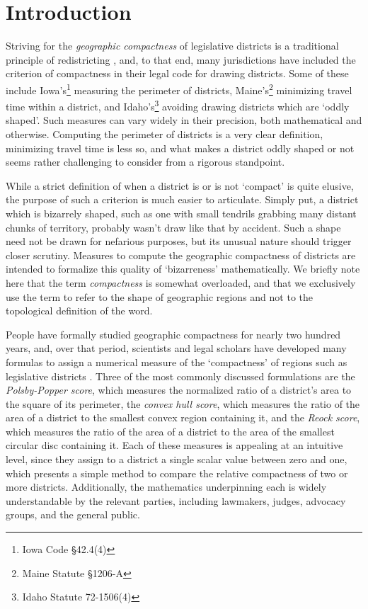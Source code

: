 \section{Introduction}
Striving for the \textit{geographic compactness} of legislative
districts is a traditional principle of redistricting \cite{altman_1998}, and, to that
end, many jurisdictions have included the criterion of compactness in
their legal code for drawing districts.  Some of these include Iowa's\footnote{Iowa Code \S42.4(4)} measuring the perimeter of districts, Maine's\footnote{Maine Statute \S1206-A} minimizing travel time within a district, and Idaho's\footnote{Idaho Statute 72-1506(4)} avoiding 
drawing districts which are \enquote*{oddly shaped}.  Such measures can vary widely in their 
precision, both mathematical and otherwise.  Computing the perimeter of districts is a very clear definition, minimizing travel time is less so, and what makes a district oddly shaped or not seems rather challenging to consider from a rigorous standpoint. 

While a strict definition of when a district is or is not \enquote*{compact} is quite elusive, the purpose of such a criterion is much easier to articulate.  Simply put, a district which is bizarrely shaped, such as one with small tendrils grabbing many distant chunks of territory,
probably wasn't draw like that by accident. Such a shape need not be drawn for nefarious
purposes, but its unusual nature should trigger closer scrutiny.  Measures to compute the
geographic compactness of districts are intended to formalize this quality of \enquote*{bizarreness}
mathematically.  We briefly note here that the term \textit{compactness} is somewhat 
overloaded, and that we exclusively use the term to refer to the shape of geographic 
regions and not to the topological definition of the word.


People have formally studied geographic compactness for nearly two hundred years, and, over that period, scientists and legal scholars have developed many formulas to assign a numerical measure of the \enquote*{compactness} of regions such as legislative districts \cite{young_compactness}.
 Three of the most commonly discussed formulations are the \textit{Polsby-Popper score}, which
measures the normalized ratio of a district's area to the square of its
perimeter, the \textit{convex hull score}, which measures the ratio
of the area of a district to the smallest convex region containing it,
and the \textit{Reock score}, which measures the ratio of the area of
a district to the area of the smallest circular disc containing it.  Each of these
measures is appealing at an intuitive level, since they assign to
a district a single scalar value between zero and one, which presents a simple 
method to compare the relative compactness of two or more districts. 
Additionally, the
mathematics underpinning each is widely understandable by the relevant
parties, including lawmakers, judges, advocacy groups, and the general
public.  

